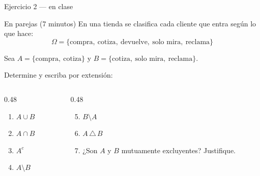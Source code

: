 \documentclass[aspectratio=169,10pt]{beamer}
\begin{document}
\begin{frame}{Ejercicio 2 — en clase}
  \begin{alertblock}{En parejas (7 minutos)}
    En una tienda se clasifica cada cliente que entra según lo que hace:
    \[ \Omega=\{\text{compra},\ \text{cotiza},\ \text{devuelve},\
                \text{solo mira},\ \text{reclama}\} \]

    Sea $A=\{\text{compra},\ \text{cotiza}\}$ y
    $B=\{\text{cotiza},\ \text{solo mira},\ \text{reclama}\}$.

    \vspace{0.25cm}
    Determine y escriba por extensión:
    \begin{columns}[T,onlytextwidth]
      \begin{column}{0.48\textwidth}
        \begin{enumerate}
          \item $A\cup B$
          \item $A\cap B$
          \item $A^{c}$
          \item $A\setminus B$
        \end{enumerate}
      \end{column}
      \begin{column}{0.48\textwidth}
        \begin{enumerate}
          \setcounter{enumi}{4}
          \item $B\setminus A$
          \item $A\,\triangle\,B$
          \item ¿Son $A$ y $B$ mutuamente excluyentes? Justifique.
        \end{enumerate}
      \end{column}
    \end{columns}
  \end{alertblock}
\end{frame}
\end{document}
